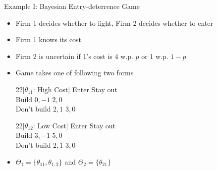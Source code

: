 \documentclass[11pt,aspectratio=169,handout]{beamer}
\begin{document}
  
  \begin{frame}{Example I: Bayesian Entry-deterrence Game}
   \begin{itemize}
    \item Firm 1 decides whether to fight, Firm 2 decides whether to enter
    \item Firm 1 knows its cost
    \item Firm 2 is uncertain if 1's cost is 4 w.p. $p$ or 1 w.p. $1-p$
    \item Game takes one of following two forms
    \vspace{1em}
    \begin{center} \scriptsize
     \begin{game}{2}{2}[$\theta_{11}$: High Cost]
      				\> Enter		\>	Stay out	\\
      Build			\> $0, -1$	\>	$2, 0$	\\
      Don't build	\> $2, 1$	\>	$3, 0$
     \end{game}\hspace{2cm}
     \begin{game}{2}{2}[$\theta_{12}$: Low Cost]
      				\> Enter		\>	Stay out	\\
      Build			\> $3, -1$	\>	$5, 0$	\\
      Don't build	\> $2, 1$	\>	$3, 0$
     \end{game}
    \end{center}
    \vspace{1em}
    \item $\Theta_1 = \{\theta_{11}, \theta_{1,2}\}$ and $\Theta_2 = \{\theta_{21}\}$
   \end{itemize}  
  \end{frame}
  
\end{document}
